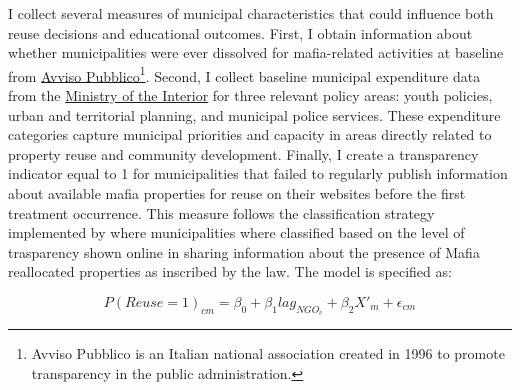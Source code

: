 \documentclass[12pt]{article}
\theoremstyle{plain}
\theoremstyle{plain}
\theoremstyle{plain}
\theoremstyle{definition}
\theoremstyle{plain}
\theoremstyle{definition}
\theoremstyle{plain}
\theoremstyle{remark}
\theoremstyle{definition}
\theoremstyle{definition}
\theoremstyle{plain}
\begin{document}
I collect several measures of municipal characteristics that could influence both reuse decisions and educational outcomes. First, I obtain information about whether municipalities were ever dissolved for mafia-related activities at baseline from \href{https://www.avvisopubblico.it/home/home/cosa-facciamo/informare/documenti-tematici/comuni-sciolti-per-mafia/}{Avviso Pubblico\footnote{Avviso Pubblico is an Italian national association created in 1996 to promote transparency in the public administration.}}. Second, I collect baseline municipal expenditure data from the \href{https://finanzalocale.interno.gov.it/banchedati.html}{Ministry of the Interior} for three relevant policy areas: youth policies, urban and territorial planning, and municipal police services. These expenditure categories capture municipal priorities and capacity in areas directly related to property reuse and community development. Finally, I create a transparency indicator equal to 1 for municipalities that failed to regularly publish information about available mafia properties for reuse on their websites before the first treatment occurrence. This measure follows the classification strategy implemented by  \citet{falcone_rimandati_2021, falcone_rimandati_2022} where municipalities where classified based on the level of trasparency shown online in sharing information about the presence of Mafia reallocated properties as inscribed by the law.  The model is specified as:\par

\begin{equation}
    P(Reuse=1)_{cm} = \beta_0 + \beta_1 lag_{NGO_{c}} + \beta_2 X'_{m} + \epsilon_{cm}
\end{equation}
\vspace{0.1cm}
\end{document}
